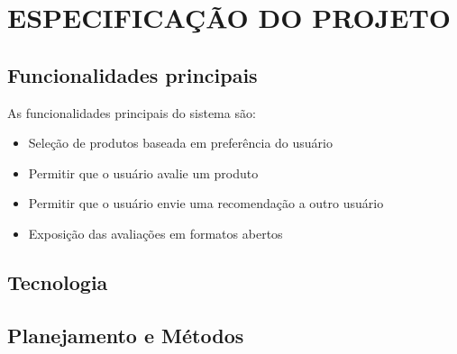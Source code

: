 \chapter{ESPECIFICAÇÃO DO PROJETO} %
\label{cha:especificacao_do_projeto}

\section{Funcionalidades principais} %
\label{sec:funcionalidades_principais}

As funcionalidades principais do sistema são:

\begin{itemize}

	\item Seleção de produtos baseada em preferência do usuário

	\item Permitir que o usuário avalie um produto

	\item Permitir que o usuário envie uma recomendação a outro usuário

	\item Exposição das avaliações em formatos abertos
	
\end{itemize}


\section{Tecnologia} %
\label{sec:tecnologia}


\section{Planejamento e Métodos} %
\label{sec:planejamento_e_métodos}



